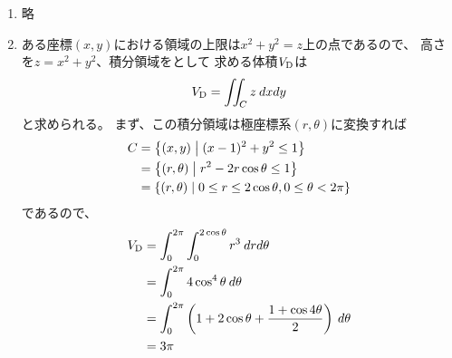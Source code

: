 \begin{ans*}
  ${}$
  \begin{enumerate}[label=(\arabic*)]
    \item 略 %
    \item ある座標$(x,y)$における領域の上限は$x^2+y^2=z$上の点であるので、
    高さを$z=x^2 + y^2$、積分領域をとして
    求める体積$V_{\rm{D}}$は
    \begin{gather}
      V_{\rm{D}} = \iint_C z \:dxdy
    \end{gather}
    と求められる。
    まず、この積分領域は極座標系$(r,\theta)$に変換すれば
    \begin{align}
      C 
      &= \left\{(x,y)\relmiddle (x-1)^2 + y^2 \leq 1 \right\} \\
      &= \left\{(r,\theta)\relmiddle r^2 - 2r\cos\theta\leq 1 \right\} \\
      &= \left\{(r,\theta)\relmiddle 0\leq r\leq 2\cos\theta, 0\leq \theta < 2\pi \right\}
    \end{align}
    であるので、
    \begin{align}
      V_{\rm{D}}
      &= \int_{0}^{2\pi}\int_{0}^{2\cos\theta}r^3\:drd\theta \\
      &= \int_{0}^{2\pi} 4\cos^4\theta\:d\theta \\
      &= \int_{0}^{2\pi} \left(1 + 2\cos\theta + \frac{1 + \cos4\theta}{2}\right)\:d\theta \\
      &= 3\pi
    \end{align}
  \end{enumerate}
  
\end{ans*}


